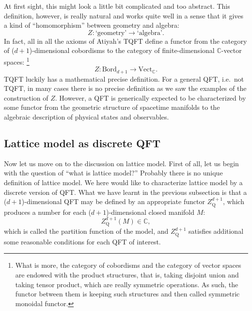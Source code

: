 At first sight, this might look a little bit complicated and too abstract.
This definition, however, is really natural and works quite well in
a sense that it gives a kind of ``homomorphism'' between geometry
and algebra:
\[
Z:\text{`geometry'}\longrightarrow\text{`algebra'}.
\]
 In fact, all in all the axioms of Atiyah's TQFT define a functor
from the category of ($d+1$)-dimensional cobordisms to the category
of finite-dimensional $\mathbb{C}$-vector spaces:%
%
\footnote{What is more, the category of cobordisms and the category of vector
spaces are endowed with the product structures, that is, taking disjoint
union and taking tensor product, which are really symmetric operations.
As such, the functor between them is keeping such structures and then
called symmetric monoidal functor. }
%
\begin{equation}
  Z:\mathrm{Bord}_{d+1}  \longrightarrow  \mathrm{Vect}_{\mathbb{C}}.
\end{equation}
 TQFT luckily has a mathematical precise definition. For a general
QFT, i.e.~not TQFT, in many cases there is no precise definition as
we saw the examples of the construction of $Z$. However, a QFT is
generically expected to be characterized by some functor from the
geometric structure of spacetime manifolds to the algebraic description
of physical states and observables.





\subsection{Lattice model as discrete QFT}

Now let us move on to the discussion on lattice model. First of all,
let us begin with the question of ``what is lattice model?'' Probably
there is no unique definition of lattice model. We here would like
to characterize lattice model by a discrete version of QFT. What we
have learnt in the previous subsection is that a ($d+1$)-dimensional
QFT may be defined by an appropriate functor $Z_{\mathrm{Q}}^{d+1}$,
which produces a number for each ($d+1$)-dimensional closed manifold
$M$:
\begin{equation}
  Z_{\mathrm{Q}}^{d+1}\left(M\right)  \in  \mathbb{C},
\end{equation}
 which is called the partition function of the model, and $Z_{\mathrm{Q}}^{d+1}$
satisfies additional some reasonable conditions for each QFT of interest.

